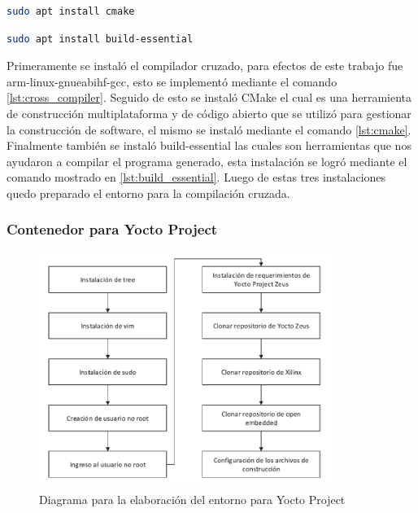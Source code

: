 \begin{lstlisting}[language=bash, caption={Instalacion de CMake, Contenedor}, label=lst:cmake]
    sudo apt install cmake
\end{lstlisting}

\begin{lstlisting}[language=bash, caption={Instalacion de build essential, Contenedor }, label=lst:build_essential]
    sudo apt install build-essential
\end{lstlisting}

Primeramente se instaló el compilador cruzado, para efectos de este trabajo fue arm-linux-gnueabihf-gcc, esto se implementó mediante el comando \ref{lst:cross_compiler}. Seguido de esto se instaló CMake el cual es una herramienta de construcción multiplataforma y de código abierto que se utilizó para gestionar la construcción de software, el mismo se instaló mediante el comando \ref{lst:cmake}. Finalmente también se instaló build-essential las cuales son herramientas que nos ayudaron a compilar el programa generado, esta instalación se logró mediante el comando mostrado en \ref{lst:build_essential}. Luego de estas tres instalaciones quedo preparado el entorno para la compilación cruzada. 

\newpage

\subsubsection{Contenedor para Yocto Project}\label{subsec:generacion_entorno_yocto}

\begin{figure}[h!] 
    \centering
    \includegraphics[width=0.85\textwidth]{fig/especifico_2/diagrama_de_entorno_yocto_project.pdf}
    \caption{Diagrama para la elaboración del entorno para Yocto Project}
    \label{fig:yocto_enviroment_diagram_figure}
\end{figure}

